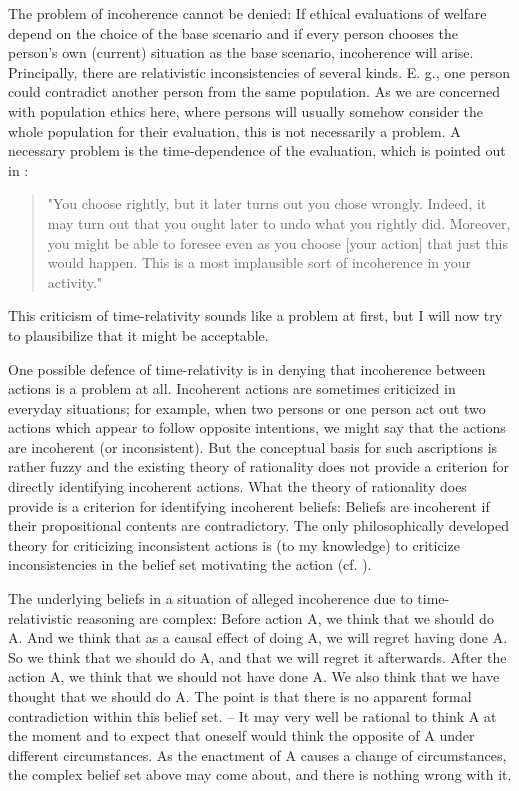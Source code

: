 The problem of incoherence cannot be denied: If ethical evaluations of welfare depend on the choice of the base scenario and if every person chooses the person's own (current) situation as the base scenario, incoherence will arise. Principally, there are relativistic inconsistencies of several kinds. E. g., one person could contradict another person from the same population. As we are concerned with population ethics here, where persons will usually somehow consider the whole population for their evaluation, this is not necessarily a problem. A necessary problem is the time-dependence of the evaluation, which is pointed out in : 
\begin{quote}
"You choose rightly, but it later turns out you chose wrongly. Indeed, it may turn out that you ought later to undo what you rightly did. Moreover, you might be able to foresee even as you choose [your action] that just this would happen. This is a most implausible sort of incoherence in your activity."
\end{quote}

This criticism of time-relativity sounds like a problem at first, but I will now try to plausibilize that it might be acceptable. 

One possible defence of time-relativity is in denying that incoherence between actions is a problem at all. Incoherent actions are sometimes criticized in everyday situations; for example, when two persons or one person act out two actions which appear to follow opposite intentions, we might say that the actions are incoherent (or inconsistent). But the conceptual basis for such ascriptions is rather fuzzy and the existing theory of rationality does not provide a criterion for directly identifying incoherent actions. What the theory of rationality does provide is a criterion for identifying incoherent beliefs: Beliefs are incoherent if their propositional contents are contradictory. The only philosophically developed theory for criticizing inconsistent actions is (to my knowledge) to criticize inconsistencies in the belief set motivating the action (cf. ). 

The underlying beliefs in a situation of alleged incoherence due to time-relativistic reasoning are complex: Before action A, we think that we should do A. And we think that as a causal effect of doing A, we will regret having done A. So we think that we should do A, and that we will regret it afterwards. After the action A, we think that we should not have done A. We also think that we have thought that we should do A. The point is that there is no apparent formal contradiction within this belief set. -- It may very well be rational to think A at the moment and to expect that oneself would think the opposite of A under different circumstances. As the enactment of A causes a change of circumstances, the complex belief set above may come about, and there is nothing wrong with it. 

